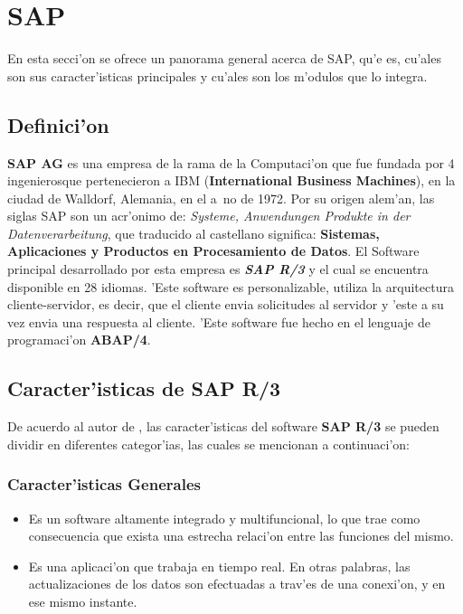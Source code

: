 \section{SAP} \label{sect:sap}

En esta secci'on se ofrece un panorama general acerca de SAP, qu'e es, cu'ales son sus caracter'isticas principales y cu'ales son los m'odulos que lo integra.

\subsection{Definici'on} \label{subsect:defprop}
\textbf{SAP AG} es una empresa de la rama de la Computaci'on que fue fundada por 4 ingenierosque pertenecieron a IBM (\textbf{International Business Machines}), en la ciudad de Walldorf, Alemania, en el a~no de 1972. Por su origen alem'an, las siglas SAP son un acr'onimo de: \textit{Systeme, Anwendungen Produkte in der Datenverarbeitung}, que traducido al castellano significa: \textbf{Sistemas, Aplicaciones y Productos en Procesamiento de Datos}. 
\newline
\newline
El Software principal desarrollado por esta empresa es \textbf{\textit{SAP R/3}} y el cual se encuentra disponible en 28 idiomas. 'Este software es personalizable, utiliza la arquitectura cliente-servidor, es decir, que el cliente envia solicitudes al servidor y 'este a su vez envia una respuesta al cliente. 'Este software fue hecho en el lenguaje de programaci'on \textbf{ABAP/4}. 

\subsection{Caracter'isticas de SAP R/3}
De acuerdo al autor de \cite{SAP01}, las caracter'isticas del software \textbf{SAP R/3} se pueden dividir en diferentes categor'ias, las cuales se mencionan a continuaci'on:

\subsubsection*{Caracter'isticas Generales}
\begin{itemize}
\item Es un software altamente integrado y multifuncional, lo que trae como consecuencia que exista una estrecha relaci'on entre las funciones del mismo.
\item Es una aplicaci'on que trabaja en tiempo real. En otras palabras, las actualizaciones de los datos son efectuadas a trav'es de una conexi'on, y en ese mismo instante.
\end{itemize}

